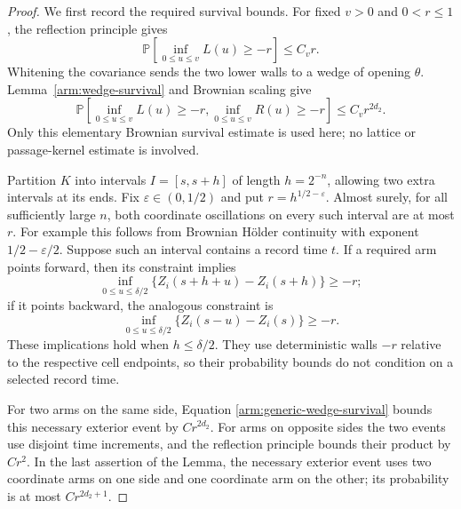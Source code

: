 \begin{proof}
We first record the required survival bounds.  For fixed $v>0$ and
$0<r\le1$, the reflection principle gives
\[
 \mathbb P\left[\inf_{0\le u\le v}L(u)\ge-r\right]\le C_vr.
\]
Whitening the covariance sends the two lower walls to a wedge of opening
$\theta$.  Lemma~\ref{arm:wedge-survival} and Brownian scaling give
\begin{equation}\label{arm:generic-wedge-survival}
 \mathbb P\left[\inf_{0\le u\le v}L(u)\ge-r,
                  \inf_{0\le u\le v}R(u)\ge-r\right]
 \le C_v r^{2d_2}.
\end{equation}
Only this elementary Brownian survival estimate is used here; no lattice
or passage-kernel estimate is involved.

Partition $K$ into intervals $I=[s,s+h]$ of length $h=2^{-n}$, allowing
two extra intervals at its ends.  Fix $\varepsilon\in(0,1/2)$ and put
$r=h^{1/2-\varepsilon}$.  Almost surely, for all sufficiently large $n$,
both coordinate oscillations on every such interval are at most $r$.
For example this follows from Brownian H\"older continuity with exponent
$1/2-\varepsilon/2$.  Suppose such an interval contains a record time
$t$.  If a required arm points forward, then its constraint implies
\[
 \inf_{0\le u\le\delta/2}
       \{Z_i(s+h+u)-Z_i(s+h)\}\ge-r;
\]
if it points backward, the analogous constraint is
\[
 \inf_{0\le u\le\delta/2}
       \{Z_i(s-u)-Z_i(s)\}\ge-r.
\]
These implications hold when $h\le\delta/2$.  They use deterministic
walls $-r$ relative to the respective cell endpoints, so their probability
bounds do not condition on a selected record time.

For two arms on the same side, Equation
\eqref{arm:generic-wedge-survival} bounds this necessary exterior event
by $Cr^{2d_2}$.  For arms on opposite sides the two events use disjoint
time increments, and the reflection principle bounds their product by
$Cr^2$.  In the last assertion of the Lemma, the necessary exterior event
uses two coordinate arms on one side and one coordinate arm on the other;
its probability is at most $Cr^{2d_2+1}$.


\end{proof}
